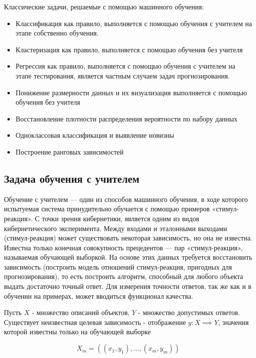 Классические задачи, решаемые с помощью машинного обучения:


\begin{itemize}

    \item Классификация как правило, выполняется с помощью обучения с учителем на этапе собственно обучения.
    \item Кластеризация как правило, выполняется с помощью обучения без учителя
    \item Регрессия как правило, выполняется с помощью обучения с учителем на этапе тестирования, является частным случаем задач прогнозирования.
    \item Понижение размерности данных и их визуализация выполняется с помощью обучения без учителя
    \item Восстановление плотности распределения вероятности по набору данных
    \item Одноклассовая классификация и выявление новизны
    \item Построение ранговых зависимостей

\end{itemize}

\subsection{Задача обучения с учителем}

Обучение с учителем — один из способов машинного обучения, в ходе которого испытуемая система принудительно обучается с помощью примеров «стимул-реакция». С точки зрения кибернетики, является одним из видов кибернетического эксперимента. Между входами и эталонными выходами (стимул-реакция) может существовать некоторая зависимость, но она не известна. Известна только конечная совокупность прецедентов — пар «стимул-реакция», называемая обучающей выборкой. На основе этих данных требуется восстановить зависимость (построить модель отношений стимул-реакция, пригодных для прогнозирования), то есть построить алгоритм, способный для любого объекта выдать достаточно точный ответ. Для измерения точности ответов, так же как и в обучении на примерах, может вводиться функционал качества.

Пусть $X$ - множество описаний объектов, $Y$ - множество допустимых ответов. Существует неизвестная целевая зависимость - отображение $y: X \implies Y$, значения которой известны только на обучающей выборке 

\begin{equation}
  X_m=((x_1,y_1),...,(x_m,y_m))
\end{equation}

